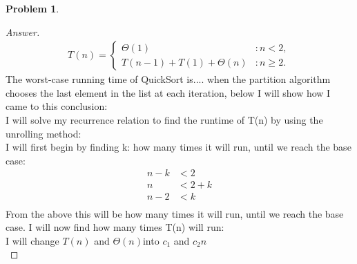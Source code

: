 \documentclass[11pt]{article}
\theoremstyle{definition}
\theoremstyle{definition}
\newtheorem{required}{Problem}
\theoremstyle{definition}
\begin{document}
\begin{required}
\begin{enumerate}[label=(\alph*)]
\begin{proof}[Answer]
\begin{align*}
T(n) = \begin{cases}
\Theta(1) & : n < 2, \\
T(n-1) + T(1) + \Theta(n) & : n \geq 2.
\end{cases}
\end{align*}
The worst-case running time of QuickSort is.... when the partition algorithm chooses the last element in the list at each iteration, below I will show how I came to this conclusion: \\

I will solve my recurrence relation to find the runtime of T(n) by using the unrolling method: \\
I will first begin by finding k: how many times it will run, until we reach the base case: \\
\begin{align*}
n-k &< 2 \\
n &< 2+k \\
n-2 &< k \\
\end{align*}
From the above this will be how many times it will run, until we reach the base case. 
I will now find how many times T(n) will run: \\
I will change $T(n)$ and $\Theta(n)$into $c_1 $ and $c_2 n$ \\


\end{proof}
\end{enumerate}
\end{required}
\end{document}

